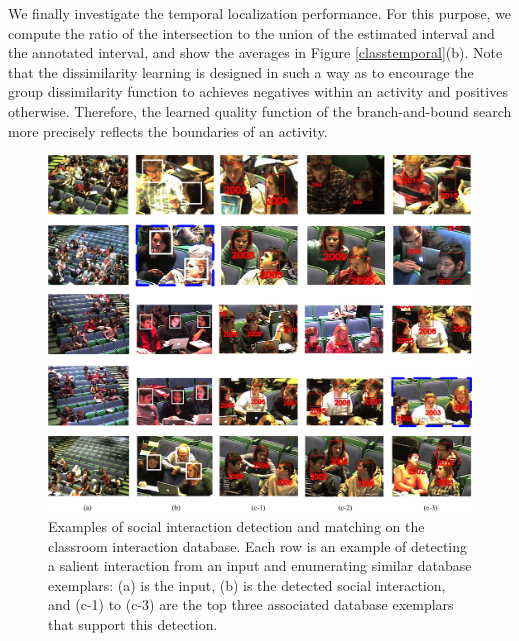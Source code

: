 We finally investigate the temporal localization performance. For this purpose, we compute the ratio of the intersection to the union of the estimated interval and the annotated interval, and show the averages in Figure \ref{classtemporal}(b).  Note that the dissimilarity learning is designed in such a way as to encourage the group dissimilarity function to achieves negatives within an activity and positives otherwise. Therefore, the learned quality function of the branch-and-bound search more precisely reflects the boundaries of an activity.


\begin{figure}
\begin{center}
\includegraphics[scale=2.25]{retrieved.png}
\end{center}
\vspace{-10pt}
\caption{Examples of social interaction detection and matching on the classroom interaction database. Each row is an example of detecting a salient interaction from an input and enumerating similar database exemplars: (a) is the input, (b) is the detected social interaction, and (c-1) to (c-3) are the top three associated database exemplars that support this detection.}
\label{retrieved}
\end{figure}


